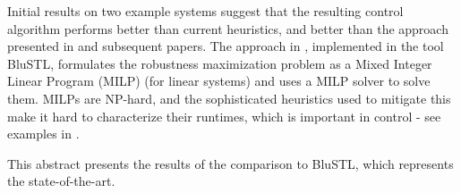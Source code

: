 Initial results on two example systems suggest that the resulting control algorithm performs better than current heuristics, and better than the approach presented in \cite{Raman14_MPCSTL} and subsequent papers.
The approach in \cite{Raman14_MPCSTL}, implemented in the tool BluSTL, formulates the robustness maximization problem as a Mixed Integer Linear Program (MILP) (for linear systems) and uses a MILP solver to solve them.
MILPs are NP-hard, and the sophisticated heuristics used to mitigate this make it hard to characterize their runtimes, which is important in control - see examples in \cite{Raman14_MPCSTL}.

This abstract presents the results of the comparison to BluSTL, which represents the state-of-the-art.

